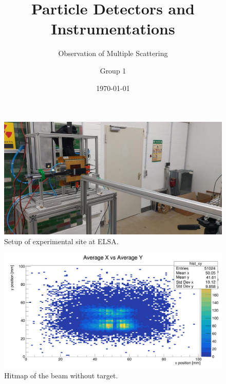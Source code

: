 \documentclass[t,9pt]{beamer}
\title[\thesection]{Particle Detectors and Instrumentations}
\subtitle{Observation of Multiple Scattering}
\author{Group 1}
\institute{Universität Bonn}
\date{\today}
\begin{document}

        \begin{frame}
                \titlepage
        \end{frame}


        \begin{frame}
                \vfill
                \begin{figure}
                        \centering
                        \includegraphics[trim={5cm 0 5cm 0},clip, width=.9\textwidth]{./figures/detector_setup_elsa.jpg}
                        \caption{Setup of experimental site at ELSA.}
                \end{figure}
        \end{frame}

        \begin{frame}
                \vfill
                \begin{figure}
                        \centering
                        \includegraphics[width=.8\textwidth]{../src/elsa/finished_plots/xy_hitmap_0.png}
                        \caption{Hitmap of the beam without target.}
                \end{figure}
        \end{frame}
\end{document}
